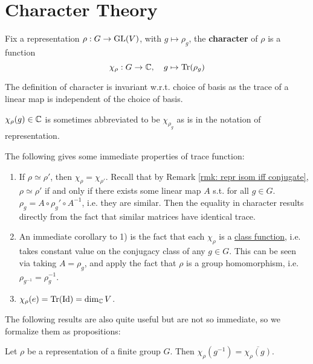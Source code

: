 \documentclass{article}
\begin{document}
\section{Character Theory}

\begin{definition}[Character]
    Fix a representation $\rho: G \to \mathrm{GL}(V)$, with $g \mapsto \rho_g$, the \textbf{character} of $\rho$ is a function
    \[
        \chi_{\rho}: G \to \mathbb{C}, \quad g \mapsto \operatorname{Tr}(\rho_g)
    \]
\end{definition}

\begin{remark}
    The definition of character is invariant w.r.t. choice of basis as the trace of a linear map is independent of the choice of basis. 
\end{remark}

\begin{notation}
    $\chi_{\rho}(g) \in \mathbb{C}$ is sometimes abbreviated to be $\chi_{\rho_g}$ as is in the notation of representation.
\end{notation}

\textstart
The following gives some immediate properties of trace function:
\begin{enumerate}[label=\arabic*)]
    \item If $\rho \simeq \rho'$, then $\chi_{\rho} = \chi_{\rho'}$. Recall that by Remark \ref{rmk: repr isom iff conjugate}, $\rho \simeq \rho'$ if and only if there exists some linear map $A$ s.t. for all $g \in G$. $\rho_g = A \circ \rho_g' \circ A^{-1}$, i.e. they are similar. Then the equality in character results directly from the fact that similar matrices have identical trace.
    \item An immediate corollary to 1) is the fact that each $\chi_{\rho}$ is a \underline{class function}, i.e. takes constant value on the conjugacy class of any $g \in G$. This can be seen via taking $A = \rho_g$, and apply the fact that $\rho$ is a group homomorphism, i.e. $\rho_{g^{-1}} = \rho_g^{-1}$.
    \item $\chi_{\rho}(e) = \operatorname{Tr}(\mathrm{Id}) = \dim_{\mathbb{C}} V$.
\end{enumerate}

\textstart
The following results are also quite useful but are not so immediate, so we formalize them as propositions:
\begin{proposition}\label{prop: character of inverse of conjugate of character}
    Let $\rho$ be a representation of a finite group $G$. Then $\chi_{\rho}(g^{-1}) = \overline{\chi_{\rho}(g)}$.
\end{proposition}
\end{document}
